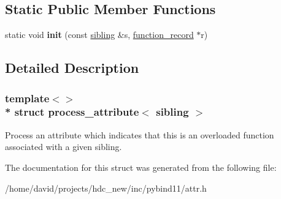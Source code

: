 \subsection*{Static Public Member Functions}
\begin{DoxyCompactItemize}
\item 
static void {\bfseries init} (const \hyperlink{structsibling}{sibling} \&s, \hyperlink{structfunction__record}{function\+\_\+record} $\ast$r)\hypertarget{structprocess__attribute_3_01sibling_01_4_a32eab1996a15ef84e77587b8f29d21f3}{}\label{structprocess__attribute_3_01sibling_01_4_a32eab1996a15ef84e77587b8f29d21f3}

\end{DoxyCompactItemize}


\subsection{Detailed Description}
\subsubsection*{template$<$$>$\\*
struct process\+\_\+attribute$<$ sibling $>$}

Process an attribute which indicates that this is an overloaded function associated with a given sibling. 

The documentation for this struct was generated from the following file\+:\begin{DoxyCompactItemize}
\item 
/home/david/projects/hdc\+\_\+new/inc/pybind11/attr.\+h\end{DoxyCompactItemize}
